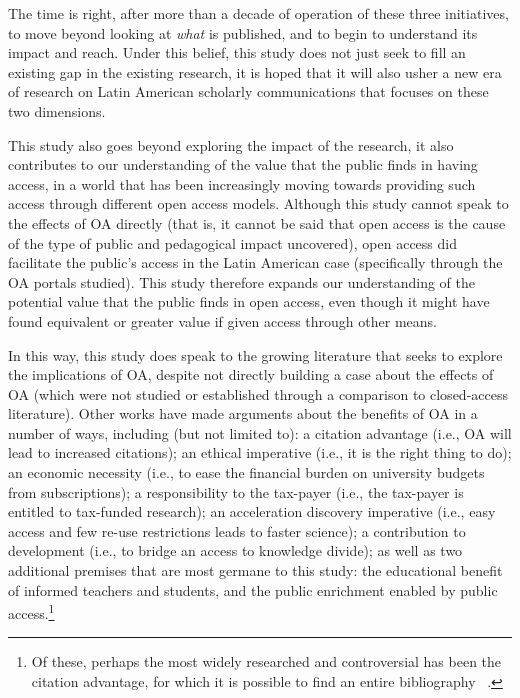 The time is right, after more than a decade of operation of these three initiatives, to move beyond looking at \emph{what} is published, and to begin to understand its impact and reach. Under this belief, this study does not just seek to fill an existing gap in the existing research, it is hoped that it will also usher a new era of research on Latin American scholarly communications that focuses on these two dimensions.

This study also goes beyond exploring the impact of the research, it also contributes to our understanding of the value that the public finds in having access, in a world that has been increasingly moving towards providing such access through different open access models. Although this study cannot speak to the effects of OA directly (that is, it cannot be said that open access is the cause of the type of public and pedagogical impact uncovered), open access did facilitate the public's access in the Latin American case (specifically through the OA portals studied). This study therefore expands our understanding of the potential value that the public finds in open access, even though it might have found equivalent or greater value if given access through other means.

In this way, this study does speak to the growing literature that seeks to explore the implications of OA, despite not directly building a case about the effects of OA (which were not studied or established through a comparison to closed-access literature). Other works have made arguments about the benefits of OA in a number of ways, including (but not limited to): a citation advantage (i.e., OA will lead to increased citations); an ethical imperative (i.e., it is the right thing to do); an economic necessity (i.e., to ease the financial burden on university budgets from subscriptions); a responsibility to the tax-payer (i.e., the tax-payer is entitled to tax-funded research); an acceleration discovery imperative (i.e., easy access and few re-use restrictions leads to faster science); a contribution to development (i.e., to bridge an access to knowledge divide); as well as two additional premises that are most germane to this study: the educational benefit of informed teachers and students, and the public enrichment enabled by public access.\footnote{Of these, perhaps the most widely researched and controversial has been the citation advantage, for which it is possible to find an entire bibliography ~\citep{Hitchcock2013}.}

